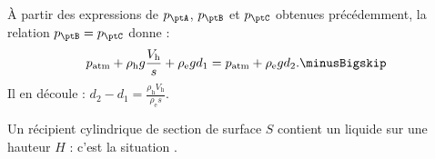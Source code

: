 
\begin{corrige}
À partir des expressions de $p_\ptA$, $p_\ptB$ et $p_\ptC$ obtenues précédemment, la relation $p_\ptB=p_\ptC$ donne :
\[
p_\text{atm}+ \rho_\text{h}g\frac{V_\text{h}}{s}  + \rho_\text{e} g d_1 = p_\text{atm} + \rho_\text{e}gd_2. \minusBigskip
\]
Il en découle : $d_2-d_1 = \frac{\rho_\text{h} V_\text{h}}{\rho_\text{e}s}$.
\end{corrige}



\finEntrainement




\newpage




\hauteurLargeurCadreReponse		{8mm}{4.5cm}
\typeEntrainement				{} %
\initialisationEntrainement


                                \initialisationPartieGauche %
Un récipient cylindrique de section de surface $S$ contient un liquide sur une hauteur $H$ : c'est la situation \reponseA.

